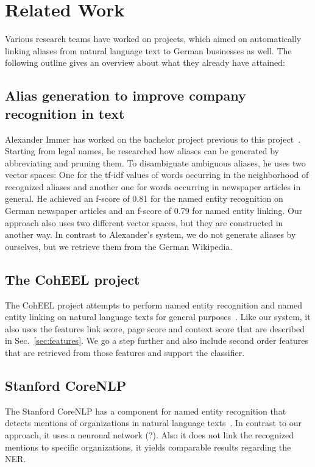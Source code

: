 \section{Related Work}
\label{sec:related_work}
Various research teams have worked on projects, which aimed on automatically linking aliases from natural language text to German businesses as well. The following outline gives an overview about what they already have attained:

\subsection{Alias generation to improve company recognition in text}
Alexander Immer has worked on the bachelor project previous to this project~\cite{immer}. Starting from legal names, he researched how aliases can be generated by abbreviating and pruning them. To disambiguate ambiguous aliases, he uses two vector spaces: One for the tf-idf values of words occurring in the neighborhood of recognized aliases and another one for words occurring in newspaper articles in general. He achieved an f-score of 0.81 for the named entity recognition on German newspaper articles and an f-score of 0.79 for named entity linking. Our approach also uses two different vector spaces, but they are constructed in another way. In contrast to Alexander's system, we do not generate aliases by ourselves, but we retrieve them from the German Wikipedia.

\subsection{The CohEEL project}
The CohEEL project attempts to perform named entity recognition and named entity linking on natural language texts for general purposes~\cite{coheel}. Like our system, it also uses the features link score, page score and context score that are described in Sec.~\ref{sec:features}. We go a step further and also include second order features that are retrieved from those features and support the classifier.

\subsection{Stanford CoreNLP}
The Stanford CoreNLP has a component for named entity recognition that detects mentions of organizations in natural language texts~\cite{stanford}. In contrast to our approach, it uses a neuronal network (?). Also it does not link the recognized mentions to specific organizations, it yields comparable results regarding the NER.
